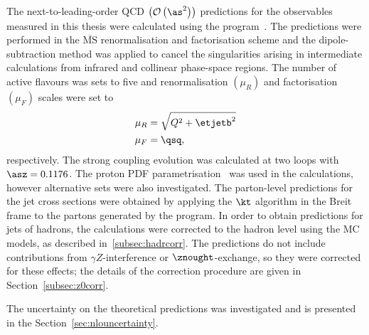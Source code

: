 The next-to-leading-order QCD $ \left( \mathcal{O}\left( \as^2\right) \right) $ predictions for the observables measured in this thesis were calculated using the \nlojet program~\cite{Nagy:1998bb, Nagy:2001xb}. The predictions were performed in the $\overline{\text{MS}}$ renormalisation and factorisation scheme and the dipole-subtraction method was applied to cancel the singularities arising in intermediate calculations from infrared and collinear phase-space regions. The number of active flavours was sets to five and renormalisation $\left( \mu_R \right) $ and factorisation $\left( \mu_F \right) $ scales were set to 
\begin{align}
\mu_R &= \sqrt{Q^2+\etjetb^2}\\
\mu_F &= \qsq,
\end{align}
respectively. The strong coupling evolution was calculated at two loops with $\asz=0.1176$. The  proton PDF parametrisation~\cite{upub:herapdf1.5} was used in the calculations, however alternative sets were also investigated. The parton-level predictions for the jet cross sections were obtained by applying the $\kt$ algorithm in the Breit frame to the partons generated by the program. In order to obtain predictions for jets of hadrons, the calculations were corrected to the hadron level using the MC models, as described in~\ref{subsec:hadrcorr}. The predictions do not include contributions from $\gamma Z$-interference or $\znought$-exchange, so they were corrected for these effects; the details of the correction procedure are given in Section~\ref{subsec:z0corr}. 

The uncertainty on the theoretical predictions was investigated and is presented in the Section~\ref{sec:nlouncertainty}.